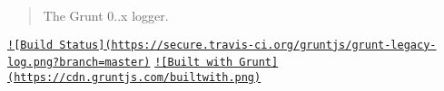 \begin{quote}
The Grunt 0..\+x logger. \end{quote}


\href{http://travis-ci.org/gruntjs/grunt-legacy-log}{\tt !\mbox{[}Build Status\mbox{]}(https\+://secure.\+travis-\/ci.\+org/gruntjs/grunt-\/legacy-\/log.\+png?branch=master)} \href{http://gruntjs.com/}{\tt !\mbox{[}Built with Grunt\mbox{]}(https\+://cdn.\+gruntjs.\+com/builtwith.\+png)} 